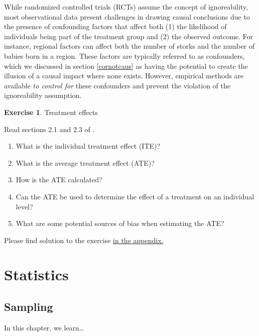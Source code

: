 \documentclass[
  12pt,
  oneside]{book}
\providecommand{\tightlist}{%
  \setlength{\itemsep}{0pt}\setlength{\parskip}{0pt}}
\theoremstyle{definition}
\theoremstyle{definition}
\theoremstyle{definition}
\newtheorem{exercise}{Exercise}[chapter]
\theoremstyle{definition}
\theoremstyle{remark}
\begin{document}
While randomized controlled trials (RCTs) assume the concept of ignoreability, most observational data present challenges in drawing causal conclusions due to the presence of confounding factors that affect both (1) the likelihood of individuals being part of the treatment group and (2) the observed outcome. For instance, regional factors can affect both the number of storks and the number of babies born in a region. These factors are typically referred to as confounders, which we discussed in section \ref{cornotcaus} as having the potential to create the illusion of a causal impact where none exists. However, empirical methods are available \emph{to control for} these confounders and prevent the violation of the ignoreability assumption.

\begin{exercise}
\protect\hypertarget{exr:treatmenteffects}{}\label{exr:treatmenteffects}Treatment effects

Read sections 2.1 and 2.3 of \citet{Neal2020Introduction}.

\begin{enumerate}
\def\labelenumi{\arabic{enumi}.}
\tightlist
\item
  What is the individual treatment effect (ITE)?
\item
  What is the average treatment effect (ATE)?
\item
  How is the ATE calculated?
\item
  Can the ATE be used to determine the effect of a treatment on an individual level?
\item
  What are some potential sources of bias when estimating the ATE?
\end{enumerate}

Please find solution to the exercise \protect\hyperlink{sol:treatmenteffects}{in the appendix.}
\end{exercise}

\hypertarget{statistics}{%
\chapter{Statistics}\label{statistics}}

\hypertarget{sampling}{%
\section{Sampling}\label{sampling}}

In this chapter, we learn\ldots{}
\end{document}
